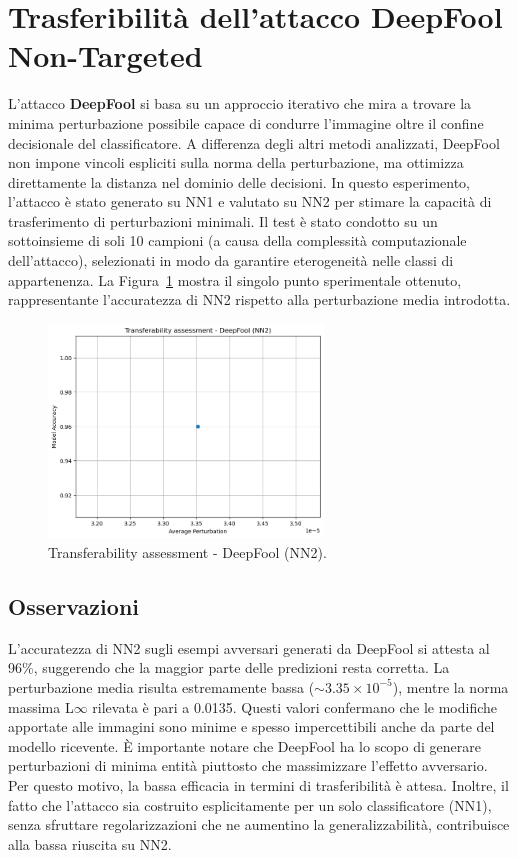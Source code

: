     \section{Trasferibilità dell'attacco DeepFool Non-Targeted}
        L'attacco \textbf{DeepFool} si basa su un approccio iterativo che mira a trovare la minima perturbazione possibile capace di condurre l'immagine oltre il confine decisionale del classificatore. A differenza degli altri metodi analizzati, DeepFool non impone vincoli espliciti sulla norma della perturbazione, ma ottimizza direttamente la distanza nel dominio delle decisioni. In questo esperimento, l’attacco è stato generato su NN1 e valutato su NN2 per stimare la capacità di trasferimento di perturbazioni minimali.
        Il test è stato condotto su un sottoinsieme di soli 10 campioni (a causa della complessità computazionale dell’attacco), selezionati in modo da garantire eterogeneità nelle classi di appartenenza.
        La Figura~\ref{fig:deepfool_transfer} mostra il singolo punto sperimentale ottenuto, rappresentante l’accuratezza di NN2 rispetto alla perturbazione media introdotta.
        
        \begin{figure}[H]
          \centering
          \includegraphics[width=0.65\textwidth]{images/untargDFtrasf.png}
          \caption{Transferability assessment - DeepFool (NN2).}
          \label{fig:deepfool_transfer}
        \end{figure}

        \subsection{Osservazioni}
            \noindent L’accuratezza di NN2 sugli esempi avversari generati da DeepFool si attesta al 96\%, suggerendo che la maggior parte delle predizioni resta corretta. La perturbazione media risulta estremamente bassa ($\sim 3.35 \times 10^{-5}$), mentre la norma massima L$\infty$ rilevata è pari a 0.0135. Questi valori confermano che le modifiche apportate alle immagini sono minime e spesso impercettibili anche da parte del modello ricevente.
            È importante notare che DeepFool ha lo scopo di generare perturbazioni di minima entità piuttosto che massimizzare l’effetto avversario. Per questo motivo, la bassa efficacia in termini di trasferibilità è attesa. Inoltre, il fatto che l’attacco sia costruito esplicitamente per un solo classificatore (NN1), senza sfruttare regolarizzazioni che ne aumentino la generalizzabilità, contribuisce alla bassa riuscita su NN2.

